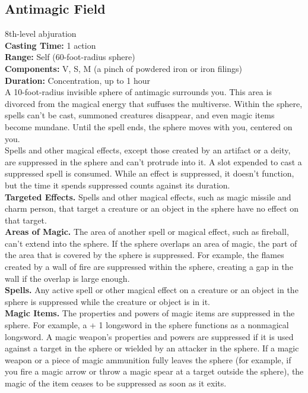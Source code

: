 \documentclass[11pt, A4paper, english]{article}
\begin{document}
		\subsection{Antimagic Field}
8th-level abjuration \\
\textbf{Casting Time:} 1 action \\
\textbf{Range:} Self (60-foot-radius sphere) \\
\textbf{Components:} V, S, M (a pinch of powdered iron or iron filings) \\
\textbf{Duration:} Concentration, up to 1 hour \\
A 10-foot-radius invisible sphere of antimagic surrounds you. This area is divorced from the magical energy that suffuses the multiverse. Within the sphere, spells can’t be cast, summoned creatures disappear, and even magic items become mundane. Until the spell ends, the sphere moves with you, centered on you. \\
Spells and other magical effects, except those created by an artifact or a deity, are suppressed in the sphere and can’t protrude into it. A slot expended to cast a suppressed spell is consumed. While an effect is suppressed, it doesn’t function, but the time it spends suppressed counts against its duration. \\
\textbf{Targeted Effects.} Spells and other magical effects, such as magic missile and charm person, that target a creature or an object in the sphere have no effect on that target. \\
\textbf{Areas of Magic.} The area of another spell or magical effect, such as fireball, can’t extend into the sphere. If the sphere overlaps an area of magic, the part of the area that is covered by the sphere is suppressed. For example, the flames created by a wall of fire are suppressed within the sphere, creating a gap in the wall if the overlap is large enough. \\
\textbf{Spells.} Any active spell or other magical effect on a creature or an object in the sphere is suppressed while the creature or object is in it. \\
\textbf{Magic Items.} The properties and powers of magic items are suppressed in the sphere. For example, a + 1 longsword in the sphere functions as a nonmagical longsword. A magic weapon’s properties and powers are suppressed if it is used against a target in the sphere or wielded by an attacker in the sphere. If a magic weapon or a piece of magic ammunition fully leaves the sphere (for example, if you fire a magic arrow or throw a magic spear at a target outside the sphere), the magic of the item ceases to be suppressed as soon as it exits. \\
\end{document}
